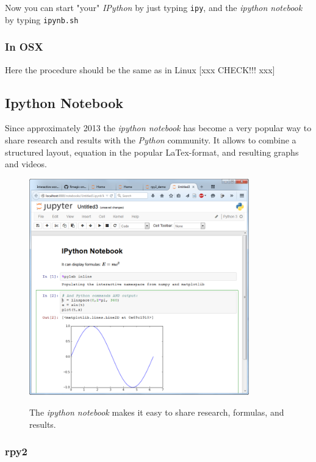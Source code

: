 Now you can start "your" \emph{IPython} by just typing \lstinline{ipy}, and the \emph{ipython notebook} by typing \lstinline{ipynb.sh}

\subsubsection{In OSX}

Here the procedure should be the same as in Linux [xxx CHECK!!! xxx]

\subsection{Ipython Notebook}

Since approximately 2013 the \emph{ipython notebook} has become a very popular way to share research and results with the \emph{Python} community. It allows to combine a structured layout, equation in the popular LaTex-format, and resulting graphs and videos.

\begin{figure}
  \centering
  \includegraphics[width=0.85\textwidth]{../Images/ipython-notebook.png}\\
  \caption{The \emph{ipython notebook} makes it easy to share research, formulas, and results.}
\end{figure}

\subsubsection{rpy2}

